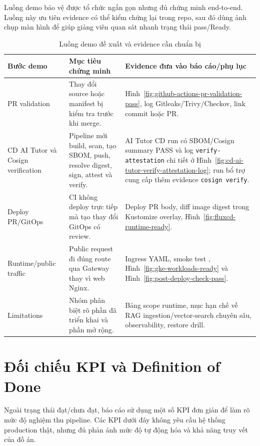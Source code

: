 Luồng demo bảo vệ được tổ chức ngắn gọn nhưng đủ chứng minh end-to-end. Luồng này ưu tiên evidence có thể kiểm chứng lại trong repo, sau đó dùng ảnh chụp màn hình để giúp giảng viên quan sát nhanh trạng thái pass/Ready.

\begin{table}[H]
\centering
\caption{Luồng demo đề xuất và evidence cần chuẩn bị}
\label{tab:demo-evidence-flow}
\begin{tabularx}{\textwidth}{|p{}|Y|Y|}
\hline
\textbf{Bước demo} & \textbf{Mục tiêu chứng minh} & \textbf{Evidence đưa vào báo cáo/phụ lục} \\
\hline
PR validation & Thay đổi source hoặc manifest bị kiểm tra trước khi merge. & Hình~\ref{fig:github-actions-pr-validation-pass}, log Gitleaks/Trivy/Checkov, link commit hoặc PR. \\
CD AI Tutor và Cosign verification & Pipeline mới build, scan, tạo SBOM, push, resolve digest, sign, attest và verify. & AI Tutor CD run có SBOM/Cosign summary PASS và log \texttt{verify-attestation} chi tiết ở Hình~\ref{fig:cd-ai-tutor-verify-attestation-log}; run bổ trợ cung cấp thêm evidence \texttt{cosign verify}. \\
Deploy PR/GitOps & CI không deploy trực tiếp mà tạo thay đổi GitOps có review. & Deploy PR body, diff image digest trong Kustomize overlay, Hình~\ref{fig:fluxcd-runtime-ready}. \\
Runtime/public traffic & Public request đi đúng route qua Gateway thay vì web Nginx. & Ingress YAML, smoke test , Hình~\ref{fig:gke-workloads-ready} và Hình~\ref{fig:post-deploy-check-pass}. \\
Limitations & Nhóm phân biệt rõ phần đã triển khai và phần mở rộng. & Bảng scope runtime, mục hạn chế về RAG ingestion/vector-search chuyên sâu, observability, restore drill. \\
\hline
\end{tabularx}
\end{table}

\section{Đối chiếu KPI và Definition of Done}

Ngoài trạng thái đạt/chưa đạt, báo cáo sử dụng một số KPI đơn giản để làm rõ mức độ nghiệm thu pipeline. Các KPI dưới đây không yêu cầu hệ thống production thật, nhưng đủ phản ánh mức độ tự động hóa và khả năng truy vết của đồ án.

